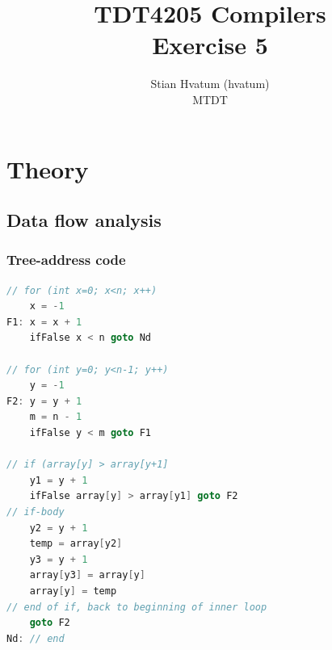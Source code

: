 \documentclass[english,a4paper]{scrartcl}
\title{TDT4205 Compilers\\
\Huge Exercise 5}
\author{Stian Hvatum (hvatum)\\MTDT}
\begin{document}
\maketitle
\tableofcontents
\newpage
\section{Theory}
\subsection{Data flow analysis}
\subsubsection{Tree-address code}
\begin{lstlisting}[language=C,morekeywords={ifFalse}]
// for (int x=0; x<n; x++)
	x = -1
F1:	x = x + 1
	ifFalse x < n goto Nd

// for (int y=0; y<n-1; y++)	
	y = -1
F2:	y = y + 1
	m = n - 1
	ifFalse y < m goto F1
	
// if (array[y] > array[y+1]	
	y1 = y + 1
	ifFalse array[y] > array[y1] goto F2
// if-body
	y2 = y + 1
	temp = array[y2]
	y3 = y + 1
	array[y3] = array[y]
	array[y] = temp
// end of if, back to beginning of inner loop
	goto F2
Nd:	// end
\end{lstlisting}
\end{document}
